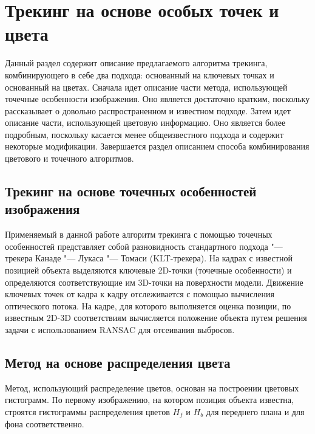 \section{Трекинг на основе особых точек и цвета}\label{tracking}

Данный раздел содержит описание предлагаемого алгоритма трекинга,
комбинирующего в себе два подхода: основанный на ключевых точках
и основанный на цветах.
Сначала идет описание части метода, использующей точечные особенности
изображения.
Оно является достаточно кратким, поскольку рассказывает о довольно
распространенном и известном подходе.
Затем идет описание части, использующей цветовую информацию.
Оно является более подробным, поскольку касается менее общеизвестного
подхода и содержит некоторые модификации.
Завершается раздел описанием способа комбинирования цветового и точечного
алгоритмов.

\subsection{Трекинг на основе точечных особенностей изображения}
\label{subs:feat_tracking}

Применяемый в данной работе алгоритм трекинга с помощью точечных особенностей
представляет собой разновидность стандартного подхода "--- трекера
Канаде "--- Лукаса "--- Томаси
(KLT-трекера)\cite{LucasAndKanade,TomasiAndKanade,ShiAndTomasi,PyrLK}.
На кадрах с известной позицией объекта выделяются ключевые 2D-точки (точечные
особенности) и определяются соответствующие им 3D-точки на поверхности модели.
Движение ключевых точек от кадра к кадру отслеживается с помощью вычисления
оптического потока.
На кадре, для которого выполняется оценка позиции, по известным 2D-3D
соответствиям вычисляется положение объекта путем решения задачи
\PnP\cite{LepetitSurvey} с использованием RANSAC\cite{RANSAC} для отсеивания
выбросов.


\subsection{Метод на основе распределения цвета}


Метод, использующий распределение цветов, основан на построении цветовых
гистограмм.
По первому изображению, на котором позиция объекта известна, строятся
гистограммы распределения цветов $H_f$ и $H_b$ для переднего плана и для фона
соответственно.

